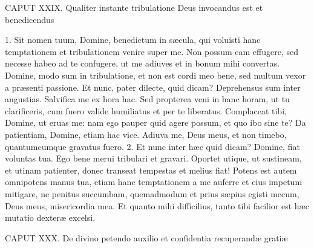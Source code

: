 CAPUT XXIX.
Qualiter instante tribulatione Deus invocandus est et benedicendus

1. Sit nomen tuum, Domine, benedictum in sæcula, qui voluisti hanc temptationem et tribulationem venire super me. Non possum eam effugere, sed necesse habeo ad te confugere, ut me adiuves et in bonum mihi convertas. Domine, modo sum in tribulatione, et non est cordi meo bene, sed multum vexor a præsenti passione. Et nunc, pater dilecte, quid dicam? Deprehensus sum inter angustias. Salvifica me ex hora hac. Sed propterea veni in hanc horam, ut tu clarificeris, cum fuero valide humiliatus et per te liberatus. Complaceat tibi, Domine, ut eruas me: nam ego pauper quid agere possum, et quo ibo sine te? Da patientiam, Domine, etiam hac vice. Adiuva me, Deus meus, et non timebo, quantumcumque gravatus fuero.
2. Et nunc inter hæc quid dicam? Domine, fiat voluntas tua. Ego bene merui tribulari et gravari. Oportet utique, ut sustineam, et utinam patienter, donec transeat tempestas et melius fiat! Potens est autem omnipotens manus tua, etiam hanc temptationem a me auferre et eius impetum mitigare, ne penitus succumbam, quemadmodum et prius sæpius egisti mecum, Deus meus, misericordia mea. Et quanto mihi difficilius, tanto tibi facilior est hæc mutatio dexteræ excelsi.


CAPUT XXX.
De divino petendo auxilio et confidentia recuperandæ gratiæ

